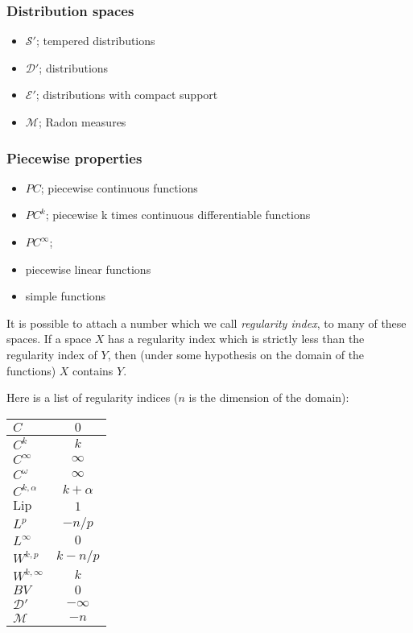 \documentclass[12pt]{article}
\begin{document}
\subsubsection*{Distribution spaces}
\begin{itemize}
\item $\mathscr{S}'$; tempered distributions
\item $\mathscr{D}'$; distributions
\item $\mathscr{E}'$; distributions with compact support
\item $\mathscr{M}$; Radon measures
\end{itemize}

\subsubsection*{Piecewise properties}
\begin{itemize}
\item $PC$; piecewise continuous functions
\item $PC^k$; piecewise k times continuous differentiable functions
\item $PC^{\infty}$; 
\item piecewise linear functions
\item simple functions
\end{itemize}

It is possible to attach a number which we call
\emph{regularity index}, to many of these spaces. 
If a space $X$ has a regularity index which is strictly less than the regularity index of $Y$, then (under some hypothesis on the domain of the functions) $X$ contains $Y$. 

Here is a list of regularity indices ($n$ is the dimension of the domain):
\begin{center}
\begin{tabular}{|l|c|}
\hline
$C$ & $0$\\
\hline
$C^k$ & $k$\\
\hline
$C^\infty$ & $\infty$\\
\hline
$C^\omega$ & $\infty$\\
\hline
$C^{k,\alpha}$ & $k+\alpha$\\
\hline
$\mathrm{Lip}$ & $1$\\
\hline
$L^p$ & $-n/p$\\
\hline
$L^\infty$ & $0$\\
\hline
$W^{k,p}$ & $k-n/p$\\
\hline
$W^{k,\infty}$ & $k$\\
\hline
$BV$ & $0$\\
\hline
$\mathscr D'$ & $-\infty$\\
\hline
$\mathscr M$ & $-n$\\
\hline
\end{tabular}
\end{center}
\end{document}
